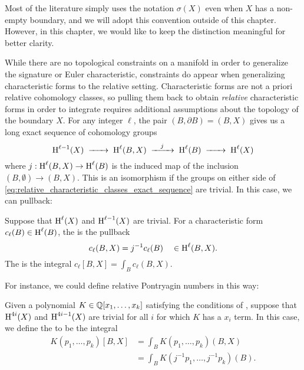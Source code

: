 \begin{convention*}
	Most of the literature simply uses the notation $\sigma(X)$ even when $X$ has a non-empty boundary, and we will adopt this convention outside of this chapter. However, in this chapter, we would like to keep the distinction meaningful for better clarity.
\end{convention*}

While there are no topological constraints on a manifold in order to generalize the signature or Euler characteristic, constraints do appear when generalizing characteristic forms to the relative setting.
Characteristic forms are not a priori relative cohomology classes, so pulling them back to obtain \emph{relative} characteristic forms in order to integrate requires additional assumptions about the topology of the boundary $X$.
For any integer $\ell$, the pair $(B, \partial B) = (B, X)$ gives us a long exact sequence of cohomology groups
\begin{equation}\label{eq:relative_characteristic_classes_exact_sequence}
	\H^{\ell-1}(X) \lkxto \H^{\ell}(B, X) \lkxto[j] \H^{\ell}(B) \lkxto \H^{\ell}(X)
\end{equation}
where $j : \operatorname{H}^{\ell}(B, X) \to \operatorname{H}^{\ell}(B)$ is the induced map of the inclusion $(B,\emptyset) \to (B, X)$. This is an isomorphism if the groups on either side of \cref{eq:relative_characteristic_classes_exact_sequence} are trivial. In this case, we can pullback:

\begin{definition}\label{defn:relative_characteristic_form}
	Suppose that $\operatorname{H}^{\ell}(X)$ and $\operatorname{H}^{\ell-1}(X)$ are trivial. For a characteristic form $c_\ell(B) \in \operatorname{H}^{\ell}(B)$, the  is the pullback
	\[
		c_\ell(B, X) = j^{-1} c_\ell(B) \quad\in \operatorname{H}^{\ell}(B, X).
	\]
	The  is the integral $c_\ell[B,X]=\int_B c_\ell(B,X)$.
\end{definition}

For instance, we could define relative Pontryagin numbers in this way:

\begin{definition}\label{defn:relative_pontryagin_number}
	Given a polynomial $K\in \mathbb{Q}[x_1,\ldots, x_k]$ satisfying the conditions of , suppose that $\operatorname{H}^{4i}(X)$ and $\operatorname{H}^{4i-1}(X)$ are trivial for all $i$ for which $K$ has a $x_i$ term.
	In this case, we define the  to be the integral
	\[
		\begin{aligned}
			K(p_1, \ldots, p_k)[B,X]
			 & = \int_B K(p_1, \ldots, p_k)(B,X)       \\
			 & = \int_B K(j^{-1}p_1, \ldots, j^{-1}p_k)(B).
		\end{aligned}
	\]
\end{definition}

